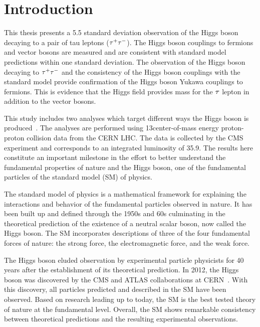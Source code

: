 \chapter{Introduction}
\label{sec:introduction}

This thesis presents a 5.5 standard deviation observation of the Higgs boson decaying to a pair
of tau leptons ($\tau^{+}\tau^{-}$). 
The Higgs boson couplings to fermions and vector bosons are measured and are 
consistent with standard model predictions within one standard deviation.
The observation of the Higgs boson decaying to $\tau^{+}\tau^{-}$ and the consistency
of the Higgs boson couplings with the standard model provide confirmation of the Higgs boson
Yukawa couplings to fermions.
This is evidence that the Higgs field provides mass
for the $\tau$ lepton in addition to the vector bosons.

This study includes two analyses which target different
ways the Higgs boson is produced~\cite{cms_13TeV_htt_jhep_2017, HIG-18-007}. The analyses are performed using
13\TeV center-of-mass energy proton-proton collision data from the CERN LHC.
The data is collected by the CMS experiment and corresponds to an integrated
luminosity of 35.9\fbinv. The results here constitute an important
milestone in the effort to better understand the fundamental properties of nature and
the Higgs boson, one of the fundamental particles of the standard model (SM) of physics.

The standard model of physics is a mathematical framework for explaining
the interactions and behavior of the fundamental particles observed in nature.
It has been built up and defined through the 1950s and 60s culminating in the
theoretical prediction of the existence of a neutral scalar boson, now called the
Higgs boson.
The SM incorporates descriptions of three of the four fundamental forces of nature:
the strong force, the electromagnetic force, and the weak force.

The Higgs boson eluded observation by experimental particle physicists
for 40 years after the establishment of its theoretical prediction. 
In 2012, the Higgs boson was discovered 
by the CMS and ATLAS collaborations at CERN~\cite{Aad:2012tfa, Chatrchyan:2012xdj, Chatrchyan:2013lba}.
With this discovery, all particles predicted and described in the SM have been observed.
Based on research leading up to today, the SM is the best tested theory of nature at the fundamental level.
Overall, the SM shows remarkable consistency between theoretical predictions and
the resulting experimental observations.

